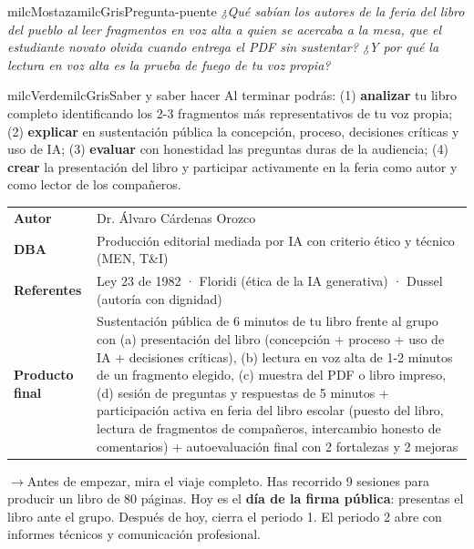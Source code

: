 \documentclass[11pt,letterpaper]{article}
\newcommand{\puente}[1]{%
  \begin{puentebox}%
    \textcolor{milcGradeDark}{$\rightarrow$}\hspace{2mm}#1%
  \end{puentebox}%
}
\begin{document}
\begin{softbox}{milcMostaza}{milcGris}{Pregunta-puente}
\textit{¿Qué sabían los autores de la feria del libro del pueblo al leer fragmentos en voz alta a quien se acercaba a la mesa, que el estudiante novato olvida cuando entrega el PDF sin sustentar? ¿Y por qué la lectura en voz alta es la prueba de fuego de tu voz propia?}
\end{softbox}

\begin{softbox}{milcVerde}{milcGris}{Saber y saber hacer}
Al terminar podrás: (1) \textbf{analizar} tu libro completo identificando los 2-3 fragmentos más representativos de tu voz propia; (2) \textbf{explicar} en sustentación pública la concepción, proceso, decisiones críticas y uso de IA; (3) \textbf{evaluar} con honestidad las preguntas duras de la audiencia; (4) \textbf{crear} la presentación del libro y participar activamente en la feria como autor y como lector de los compañeros.
\end{softbox}



\small
\begin{tabularx}{\textwidth}{>{\bfseries}p{3.0cm}Y}
Autor & Dr. Álvaro Cárdenas Orozco\\
DBA & Producción editorial mediada por IA con criterio ético y técnico (MEN, T\&I)\\
Referentes & Ley 23 de 1982 · Floridi (ética de la IA generativa) · Dussel (autoría con dignidad)\\
Producto final & Sustentación pública de 6 minutos de tu libro frente al grupo con (a) presentación del libro (concepción + proceso + uso de IA + decisiones críticas), (b) lectura en voz alta de 1-2 minutos de un fragmento elegido, (c) muestra del PDF o libro impreso, (d) sesión de preguntas y respuestas de 5 minutos + participación activa en feria del libro escolar (puesto del libro, lectura de fragmentos de compañeros, intercambio honesto de comentarios) + autoevaluación final con 2 fortalezas y 2 mejoras\\
\end{tabularx}
\normalsize

\puente{Antes de empezar, mira el viaje completo. Has recorrido 9 sesiones para producir un libro de 80 páginas. Hoy es el \textbf{día de la firma pública}: presentas el libro ante el grupo. Después de hoy, cierra el periodo 1. El periodo 2 abre con informes técnicos y comunicación profesional.}
\end{document}
